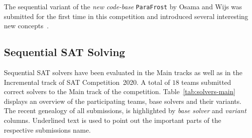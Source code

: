 \documentclass{elsarticle}
\newcommand{\solver}[1]{\texttt{#1}}
\begin{document}
The sequential variant of the \emph{new code-base} \solver{ParaFrost} by Osama and Wijs was submitted for the first time in this competition and introduced several interesting new concepts~\cite{Osama:SC2020:Parafrost}. 


\subsection{Sequential SAT Solving}
\label{sec:part:seq}

Sequential SAT solvers have been evaluated in the Main tracks as well as in the Incremental track of SAT Competition~2020. 
A total of $18$ teams submitted correct solvers to the Main track of the competition. 
Table~\ref{tab:solvers-main} displays an overview of the participating teams, base solvers and their variants. 
The recent genealogy of all submissions, is highlighted by \emph{base solver} and \emph{variant} columns. 
Underlined text is used to point out the important parts of the respective submissions name.

\renewcommand{\solver}[1]{\underline{\texttt{#1}}}
\newcommand{\solbert}[1]{\texttt{#1}}
\end{document}
